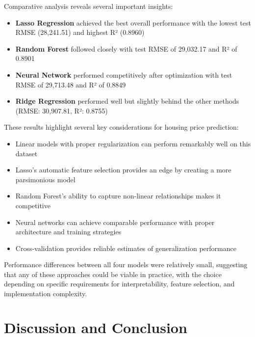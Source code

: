 \documentclass[12pt]{report}
\begin{document}
Comparative analysis reveals several important insights:
\begin{itemize}
    \item \textbf{Lasso Regression} achieved the best overall performance with the lowest test RMSE (28,241.51) and highest R² (0.8960)
    \item \textbf{Random Forest} followed closely with test RMSE of 29,032.17 and R² of 0.8901
    \item \textbf{Neural Network} performed competitively after optimization with test RMSE of 29,713.48 and R² of 0.8849
    \item \textbf{Ridge Regression} performed well but slightly behind the other methods (RMSE: 30,907.81, R²: 0.8755)
\end{itemize}

These results highlight several key considerations for housing price prediction:
\begin{itemize}
    \item Linear models with proper regularization can perform remarkably well on this dataset
    \item Lasso's automatic feature selection provides an edge by creating a more parsimonious model
    \item Random Forest's ability to capture non-linear relationships makes it competitive
    \item Neural networks can achieve comparable performance with proper architecture and training strategies
    \item Cross-validation provides reliable estimates of generalization performance
\end{itemize}

Performance differences between all four models were relatively small, suggesting that any of these approaches could be viable in practice, with the choice depending on specific requirements for interpretability, feature selection, and implementation complexity.
\chapter{Discussion and Conclusion}
\end{document}
